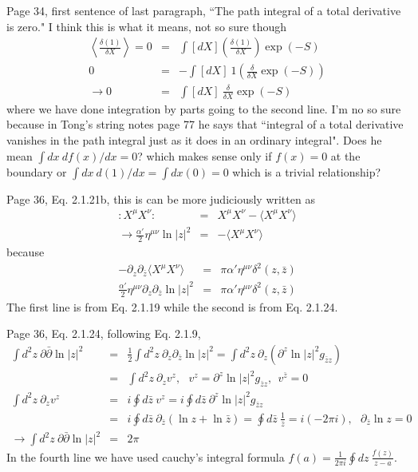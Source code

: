 \documentclass[aps,preprint,preprintnumbers,nofootinbib,showpacs,prd]{revtex4-1}
\newcommand{\nbea}{\begin{eqnarray*}}
\newcommand{\neea}{\end{eqnarray*}}
\begin{document}
Page 34, first sentence of last paragraph, ``The path integral of a total derivative is zero." I think this is what it means, not so sure though
%
\nbea
\left \langle \frac{\delta ( 1 ) }{\delta X} \right \rangle = 0  & = & \int [dX] \left ( \frac{\delta ( 1 ) }{\delta X} \right ) \exp(-S) \\
0 & = & - \int [dX] ~ 1 \left ( \frac{\delta }{\delta X} \exp(-S) \right ) \\
\longrightarrow 0 & = & \int [dX] ~ \frac{\delta }{\delta X} \exp(-S)
\neea
%
where we have done integration by parts going to the second line. I'm no so sure because in Tong's string notes page 77 he says that ``integral of a total derivative vanishes in the path integral just as it does in an ordinary integral". Does he mean $\int dx~df(x)/dx = 0$? which makes sense only if $f(x) = 0$ at the boundary or $\int dx ~ d(1)/dx = \int dx (0) = 0$ which is a trivial relationship?

Page 36, Eq. 2.1.21b, this is can be more judiciously written as
%
\nbea
:X^\mu X^\nu: & = & X^\mu X^\nu - \langle X^\mu X^\nu \rangle \\
\rightarrow \frac{\alpha'}{2} \eta^{\mu\nu} \ln |z|^2 & = & - \langle X^\mu X^\nu \rangle
\neea
%
because
%
\nbea
-\partial_z \partial_{\bar z} \langle X^\mu X^\nu \rangle & = & \pi \alpha' \eta^{\mu\nu} \delta^2(z,\bar z) \\
\frac{\alpha'}{2} \eta^{\mu\nu} \partial_z \partial_{\bar z} \ln |z|^2 & = & \pi \alpha' \eta^{\mu\nu} \delta^2(z,\bar z)
\neea
%
The first line is from Eq. 2.1.19 while the second is from Eq. 2.1.24.

Page 36, Eq. 2.1.24, following Eq. 2.1.9,
%
\nbea
\int d^2z~ \partial \bar \partial \ln |z|^2 & = & \frac{1}{2} \int d^2z~ \partial_z \partial_{\bar z} \ln |z|^2 = \int d^2z~ \partial_z (\partial^{z}\ln |z|^2 g_{\bar z z}) \\
& = & \int d^2z~ \partial_z v^z, ~~~ v^z = \partial^{z}\ln |z|^2 g_{\bar z z}, ~~ v^{\bar z} = 0 \\
\int d^2z~ \partial_z v^z & = & i\oint d\bar z ~ v^z = i\oint d\bar z ~ \partial^{z}\ln |z|^2 g_{\bar z z}\\
& = & i \oint d\bar z ~ \partial_{\bar z} (\ln z + \ln \bar z) = \oint d\bar z ~ \frac{1}{\bar z} =  i (- 2 \pi i), ~~~ \partial_{\bar z} \ln z = 0 \\
\rightarrow \int d^2z~ \partial \bar \partial \ln |z|^2 & = & 2 \pi
\neea
%
In the fourth line we have used cauchy's integral formula $f(a) = \frac{1}{2\pi i}\oint dz~\frac{f(z)}{z-a}$. 
\end{document}
